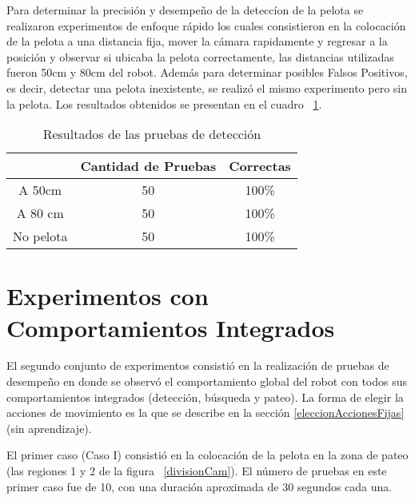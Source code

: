 Para determinar la precisi\'on y desempe\~no de la detecc\'ion de la pelota se realizaron experimentos de enfoque r\'apido los cuales consistieron en la colocaci\'on de la pelota a una distancia fija, mover la c\'amara rapidamente y regresar a la posici\'on y observar si ubicaba la pelota correctamente, las distancias utilizadas fueron 50cm y 80cm del robot. Adem\'as para determinar posibles Falsos Positivos, es decir, detectar una pelota inexistente, se realiz\'o el mismo experimento pero sin la pelota. Los resultados obtenidos se presentan en el cuadro ~\ref{fig:deteccion}.

\begin{table}
\centering
\begin{tabular}{|c|c|c|}
 \hline 
  & Cantidad de Pruebas & Correctas \\ 
 \hline 
 A 50cm & 50 & 100\% \\ 
 \hline 
 A 80 cm & 50 & 100\% \\ 
 \hline 
 No pelota & 50 & 100\% \\ 
  \hline 

 \end{tabular}  
\caption{Resultados de las pruebas de detecci\'on}
\label{fig:deteccion} 

\end{table}

\section{Experimentos con Comportamientos Integrados}
\label{sec:experimentosintegrados}

El segundo conjunto de experimentos consistió en la realización de pruebas de desempeño en donde se observó el comportamiento global del robot con todos sus comportamientos integrados (detección, búsqueda y pateo). La forma de elegir la acciones de movimiento es la que se describe en la sección \ref{eleccionAccionesFijas} (sin aprendizaje). 

El  primer caso (Caso I) consistió en la colocación de la pelota en la zona de pateo (las regiones 1 y 2 de la figura ~\ref{divisionCam}). El número de pruebas en este primer caso fue de 10, con una duración aproximada de 30 segundos cada una.

